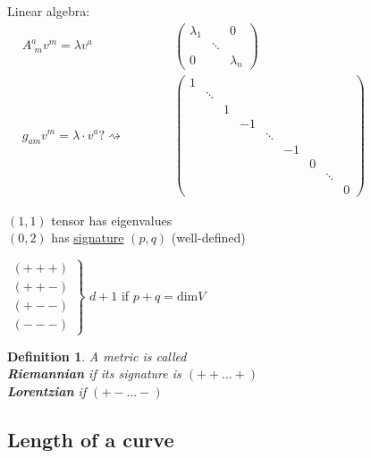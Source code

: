\documentclass[10pt, twoside]{amsart}
\newtheorem{definition}{Definition}
\begin{document}
\begin{multicols*}{2}
Linear algebra: \quad \quad \, $ \begin{aligned} & A^a_{\,\,m}v^m = \lambda v^a & \quad \quad \quad \, \left( \begin{matrix} \lambda_1 & & 0 \\
    & \ddots & \\ 
    0 & & \lambda_n \end{matrix} \right) \\
  & g_{am} v^m = \lambda \cdot v^a ? \rightsquigarrow  & \quad \quad \quad \, \left( \begin{matrix} 
    1        &   &    &        &    &   &        & \\
    & \ddots &   &    &        &    &   &        & \\
    &        & 1 &    &        &    &   &        & \\
    &        &   & -1 &        &    &   &        & \\
    &        &   &    & \ddots &    &   &        & \\
    &        &   &    &        & -1 &   &        & \\
    &        &   &    &        &    & 0 &        & \\
    &        &   &    &        &    &   & \ddots & \\
    &        &   &    &        &    &   &        & 0 \end{matrix} \right)
\end{aligned}$

$(1,1)$ tensor has eigenvalues \\
$(0,2)$ has \underline{signature} $(p,q)$ (well-defined)

$\left. \begin{aligned}
  (+++) \\
  (++-) \\
  (+--) \\
  (---) \end{aligned} \right\rbrace$ $d+1$ if $p+q = \text{dim}V$


\begin{definition} A metric is called  \\
\textbf{Riemannian} if its signature is $(++ \dots +)$ \\
\textbf{Lorentzian} if $(+-\dots -)$ 
\end{definition}


\subsection{Length of a curve}


\end{multicols*}
\end{document}
